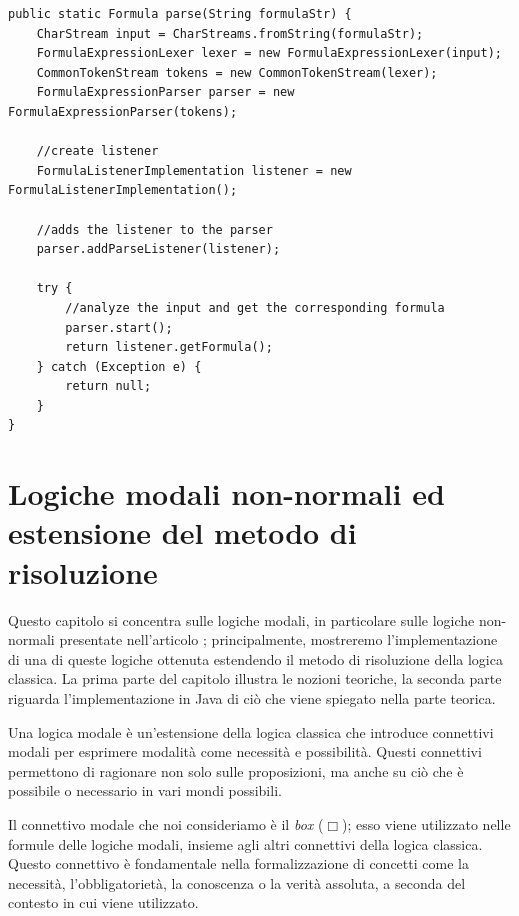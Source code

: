 \documentclass[a4paper,12pt]{report}
\begin{document}
\begin{minipage}{\linewidth}
    \begin{lstlisting}[caption={Metodo \texttt{parse} della classe \texttt{ParseFormula}}, label={parse}]
public static Formula parse(String formulaStr) {
    CharStream input = CharStreams.fromString(formulaStr);
    FormulaExpressionLexer lexer = new FormulaExpressionLexer(input);
    CommonTokenStream tokens = new CommonTokenStream(lexer);
    FormulaExpressionParser parser = new FormulaExpressionParser(tokens);

    //create listener
    FormulaListenerImplementation listener = new FormulaListenerImplementation();

    //adds the listener to the parser
    parser.addParseListener(listener);

    try {
        //analyze the input and get the corresponding formula
        parser.start();
        return listener.getFormula();
    } catch (Exception e) {
        return null;
    }
}
    \end{lstlisting}
\end{minipage}


% 
% 
\chapter{Logiche modali non-normali ed estensione del metodo di risoluzione}
\label{modal}
Questo capitolo si concentra sulle logiche modali, in particolare sulle logiche non-normali presentate nell'articolo \cite{Articolo_resolution}; principalmente, mostreremo l'implementazione di una di queste logiche ottenuta estendendo il metodo di risoluzione della logica classica. La prima parte del capitolo illustra le nozioni teoriche, la seconda parte riguarda l'implementazione in Java di ciò che viene spiegato nella parte teorica. 

Una logica modale è un'estensione della logica classica che introduce connettivi modali per esprimere modalità come necessità e possibilità. Questi connettivi permettono di ragionare non solo sulle proposizioni, ma anche su ciò che è possibile o necessario in vari mondi possibili.

Il connettivo modale che noi consideriamo è il \emph{box} ($\Box$); esso viene utilizzato nelle formule delle logiche modali, insieme agli altri connettivi della logica classica. Questo connettivo è fondamentale nella formalizzazione di concetti come la necessità, l'obbligatorietà, la conoscenza o la verità assoluta, a seconda del contesto in cui viene utilizzato.
\end{document}
